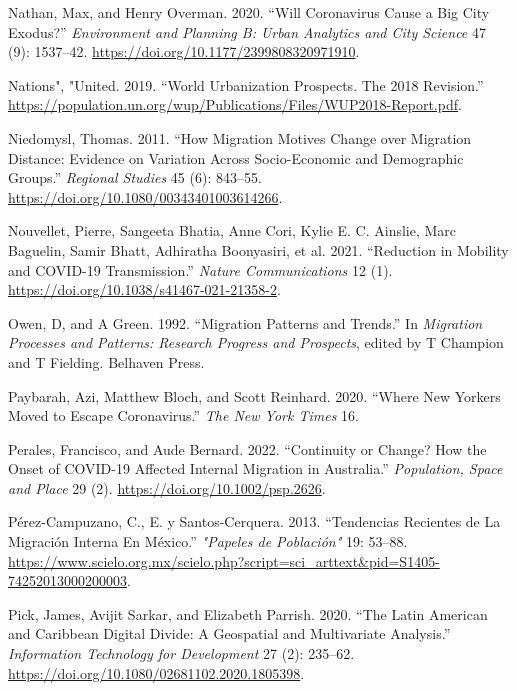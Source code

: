 \documentclass[
  11pt,
]{article}
\newlength{\cslhangindent}
\newlength{\cslentryspacingunit} %
\newenvironment{CSLReferences}[2] %
 {%
  \setlength{\parindent}{0pt}
  \ifodd #1
  \let\oldpar\par
  \def\par{\hangindent=\cslhangindent\oldpar}
  \fi
  \setlength{\parskip}{#2\cslentryspacingunit}
 }%
 {}
\begin{document}
\begin{CSLReferences}{1}{0}
\leavevmode{}%
Nathan, Max, and Henry Overman. 2020. {``Will Coronavirus Cause a Big
City Exodus?''} \emph{Environment and Planning B: Urban Analytics and
City Science} 47 (9): 1537--42.
\url{https://doi.org/10.1177/2399808320971910}.

\leavevmode{}%
Nations", "United. 2019. {``World Urbanization Prospects. The 2018
Revision.''}
\url{https://population.un.org/wup/Publications/Files/WUP2018-Report.pdf}.

\leavevmode{}%
Niedomysl, Thomas. 2011. {``How Migration Motives Change over Migration
Distance: Evidence on Variation Across Socio-Economic and Demographic
Groups.''} \emph{Regional Studies} 45 (6): 843--55.
\url{https://doi.org/10.1080/00343401003614266}.

\leavevmode{}%
Nouvellet, Pierre, Sangeeta Bhatia, Anne Cori, Kylie E. C. Ainslie, Marc
Baguelin, Samir Bhatt, Adhiratha Boonyasiri, et al. 2021. {``Reduction
in Mobility and COVID-19 Transmission.''} \emph{Nature Communications}
12 (1). \url{https://doi.org/10.1038/s41467-021-21358-2}.

\leavevmode{}%
Owen, D, and A Green. 1992. {``Migration Patterns and Trends.''} In
\emph{Migration Processes and Patterns: Research Progress and
Prospects}, edited by T Champion and T Fielding. Belhaven Press.

\leavevmode{}%
Paybarah, Azi, Matthew Bloch, and Scott Reinhard. 2020. {``Where New
Yorkers Moved to Escape Coronavirus.''} \emph{The New York Times} 16.

\leavevmode{}%
Perales, Francisco, and Aude Bernard. 2022. {``Continuity or Change? How
the Onset of COVID{-}19 Affected Internal Migration in Australia.''}
\emph{Population, Space and Place} 29 (2).
\url{https://doi.org/10.1002/psp.2626}.

\leavevmode{}%
Pérez-Campuzano, C., E. y Santos-Cerquera. 2013. {``Tendencias Recientes
de La Migración Interna En México.''} \emph{"Papeles de Población"} 19:
53--88.
\url{https://www.scielo.org.mx/scielo.php?script=sci_arttext\&pid=S1405-74252013000200003}.

\leavevmode{}%
Pick, James, Avijit Sarkar, and Elizabeth Parrish. 2020. {``The Latin
American and Caribbean Digital Divide: A Geospatial and Multivariate
Analysis.''} \emph{Information Technology for Development} 27 (2):
235--62. \url{https://doi.org/10.1080/02681102.2020.1805398}.


\end{CSLReferences}
\end{document}
